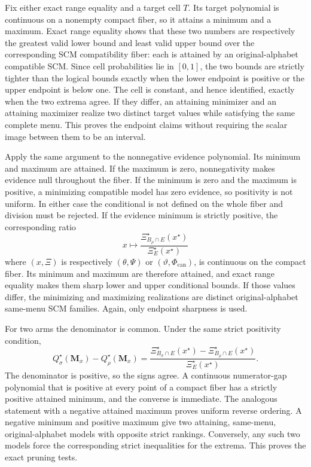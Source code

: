 Fix either exact range equality and a target cell \(T\). Its target polynomial is continuous on a nonempty compact fiber, so it attains a minimum and a maximum. Exact range equality shows that these two numbers are respectively the greatest valid lower bound and least valid upper bound over the corresponding SCM compatibility fiber: each is attained by an original-alphabet compatible SCM. Since cell probabilities lie in \([0,1]\), the two bounds are strictly tighter than the logical bounds exactly when the lower endpoint is positive or the upper endpoint is below one. The cell is constant, and hence identified, exactly when the two extrema agree. If they differ, an attaining minimizer and an attaining maximizer realize two distinct target values while satisfying the same complete menu. This proves the endpoint claims without requiring the scalar image between them to be an interval.

Apply the same argument to the nonnegative evidence polynomial. Its minimum and maximum are attained. If the maximum is zero, nonnegativity makes evidence null throughout the fiber. If the minimum is zero and the maximum is positive, a minimizing compatible model has zero evidence, so positivity is not uniform. In either case the conditional is not defined on the whole fiber and division must be rejected. If the evidence minimum is strictly positive, the corresponding ratio
\[
x\longmapsto
\frac{\Xi_{B_\rho\cap E}^\star(x^\star)}
     {\Xi_E^\star(x^\star)}
\]
where \((x,\Xi)\) is respectively \((\theta,\Psi)\) or \((\vartheta,\Phi_{\mathrm{can}})\), is continuous on the compact fiber. Its minimum and maximum are therefore attained, and exact range equality makes them sharp lower and upper conditional bounds. If those values differ, the minimizing and maximizing realizations are distinct original-alphabet same-menu SCM families. Again, only endpoint sharpness is used.

For two arms the denominator is common. Under the same strict positivity condition,
\[
Q_\sigma^\star(\mathbf M_x)-Q_\rho^\star(\mathbf M_x)
=\frac{\Xi_{B_\sigma\cap E}^\star(x^\star)
-\Xi_{B_\rho\cap E}^\star(x^\star)}
       {\Xi_E^\star(x^\star)}.
\]
The denominator is positive, so the signs agree. A continuous numerator-gap polynomial that is positive at every point of a compact fiber has a strictly positive attained minimum, and the converse is immediate. The analogous statement with a negative attained maximum proves uniform reverse ordering. A negative minimum and positive maximum give two attaining, same-menu, original-alphabet models with opposite strict rankings. Conversely, any such two models force the corresponding strict inequalities for the extrema. This proves the exact pruning tests.


